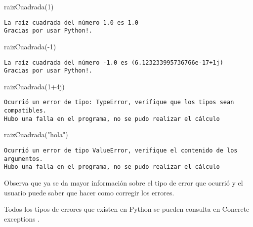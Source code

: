 \documentclass[
  letterpaper,
  DIV=11,
  numbers=noendperiod]{scrreprt}
\newenvironment{Shaded}{\begin{snugshade}}{\end{snugshade}}
\newcommand{\DecValTok}[1]{\textcolor[rgb]{0.68,0.00,0.00}{#1}}
\newcommand{\NormalTok}[1]{\textcolor[rgb]{0.00,0.23,0.31}{#1}}
\newcommand{\OperatorTok}[1]{\textcolor[rgb]{0.37,0.37,0.37}{#1}}
\newcommand{\OtherTok}[1]{\textcolor[rgb]{0.00,0.23,0.31}{#1}}
\newcommand{\StringTok}[1]{\textcolor[rgb]{0.13,0.47,0.30}{#1}}
\begin{document}
\begin{Shaded}
\begin{Highlighting}[]
\NormalTok{raizCuadrada(}\DecValTok{1}\NormalTok{)}
\end{Highlighting}
\end{Shaded}

\begin{verbatim}
La raíz cuadrada del número 1.0 es 1.0
Gracias por usar Python!.
\end{verbatim}

\begin{Shaded}
\begin{Highlighting}[]
\NormalTok{raizCuadrada(}\OperatorTok{{-}}\DecValTok{1}\NormalTok{)}
\end{Highlighting}
\end{Shaded}

\begin{verbatim}
La raíz cuadrada del número -1.0 es (6.123233995736766e-17+1j)
Gracias por usar Python!.
\end{verbatim}

\begin{Shaded}
\begin{Highlighting}[]
\NormalTok{raizCuadrada(}\DecValTok{1}\OperatorTok{+}\OtherTok{4j}\NormalTok{)}
\end{Highlighting}
\end{Shaded}

\begin{verbatim}
Ocurrió un error de tipo: TypeError, verifique que los tipos sean compatibles.
Hubo una falla en el programa, no se pudo realizar el cálculo
\end{verbatim}

\begin{Shaded}
\begin{Highlighting}[]
\NormalTok{raizCuadrada(}\StringTok{"hola"}\NormalTok{)}
\end{Highlighting}
\end{Shaded}

\begin{verbatim}
Ocurrió un error de tipo ValueError, verifique el contenido de los argumentos.
Hubo una falla en el programa, no se pudo realizar el cálculo
\end{verbatim}

Observa que ya se da mayor información sobre el tipo de error que
ocurrió y el usuario puede saber que hacer como corregir los errores.

Todos los tipos de errores que existen en Python se pueden consulta en
Concrete exceptions .
\end{document}
